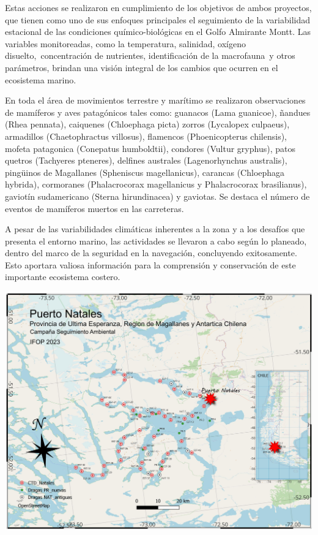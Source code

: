 \documentclass[
  letterpaper,
  DIV=11,
  numbers=noendperiod]{scrartcl}
\begin{document}
Estas acciones se realizaron en cumplimiento de los objetivos de ambos
proyectos, que tienen como uno de sus enfoques principales el
seguimiento de la variabilidad estacional de las condiciones
químico-biológicas en el Golfo Almirante Montt. Las variables
monitoreadas, como la temperatura, salinidad, oxígeno
disuelto,~concentración de nutrientes, identificación de la macrofauna~y
otros parámetros, brindan una visión integral de los cambios que ocurren
en el ecosistema marino.~

En toda el área de movimientos terrestre y marítimo se realizaron
observaciones de mamíferos y aves patagónicos tales como: guanacos (Lama
guanicoe), ñandues (Rhea pennata), caiquenes (Chloephaga picta) zorros
(Lycalopex culpaeus), armadillos (Chaetophractus villosus), flamencos
(Phoenicopterus chilensis), mofeta patagonica (Conepatus humboldtii),
condores (Vultur gryphus), patos quetros (Tachyeres pteneres), delfines
australes (Lagenorhynchus australis), pingüinos de Magallanes
(Spheniscus magellanicus), carancas (Chloephaga hybrida), cormoranes
(Phalacrocorax magellanicus y Phalacrocorax brasilianus), gaviotín
sudamericano (Sterna hirundinacea) y gaviotas. Se destaca el número de
eventos de mamíferos muertos en las carreteras.

A pesar de las variabilidades climáticas inherentes a la zona y a los
desafíos que presenta el entorno marino, las actividades se llevaron a
cabo según lo planeado, dentro del marco de la seguridad en la
navegación, concluyendo exitosamente. Esto aportara valiosa información
para la comprensión y conservación de este importante ecosistema
costero.

\includegraphics{images/Mapa natales_5.jpeg}
\end{document}
